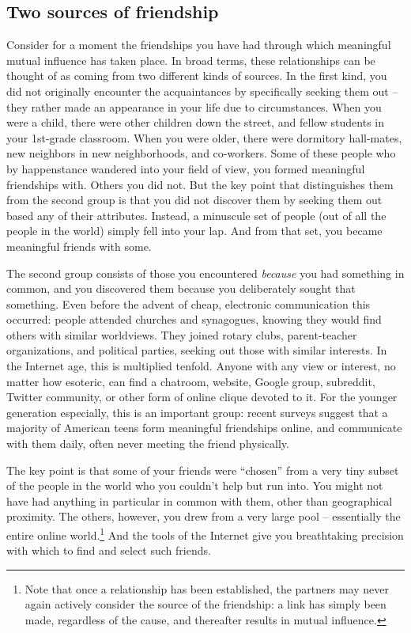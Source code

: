 
\subsection{Two sources of friendship}

Consider for a moment the friendships you have had through which meaningful
mutual influence has taken place. In broad terms, these relationships can be
thought of as coming from two different kinds of sources. In the first kind,
you did not originally encounter the acquaintances by specifically seeking
them out -- they rather made an appearance in your life due to circumstances.
When you were a child, there were other children down the street, and fellow
students in your 1st-grade classroom. When you were older, there were
dormitory hall-mates, new neighbors in new neighborhoods, and co-workers. Some
of these people who by happenstance wandered into your field of view, you
formed meaningful friendships with. Others you did not. But the key point that
distinguishes them from the second group is that you did not discover them by
seeking them out based any of their attributes. Instead, a minuscule set of
people (out of all the people in the world) simply fell into your lap. And
from that set, you became meaningful friends with some.

The second group consists of those you encountered \textit{because} you had
something in common, and you discovered them because you deliberately sought
that something. Even before the advent of cheap, electronic communication this
occurred: people attended churches and synagogues, knowing they would find
others with similar worldviews. They joined rotary clubs, parent-teacher
organizations, and political parties, seeking out those with similar
interests. In the Internet age, this is multiplied tenfold. Anyone with any
view or interest, no matter how esoteric, can find a chat\-room, website, Google
group, subreddit, Twitter community, or other form of online clique devoted to
it. For the younger generation especially, this is an important group: recent
surveys suggest that a majority of American teens form meaningful friendships
online, and communicate with them daily, often never meeting the friend
physically.\cite{lenhart_teens_2015}

The key point is that some of your friends were ``chosen'' from a very tiny
subset of the people in the world who you couldn't help but run into. You
might not have had anything in particular in common with them, other than
geographical proximity. The others, however, you drew from a very large pool
-- essentially the entire online world.\footnote{Note that once a relationship
has been established, the partners may never again actively consider the
source of the friendship: a link has simply been made, regardless of the
cause, and thereafter results in mutual influence.} And the tools of the
Internet give you breathtaking precision with which to find and select such
friends.

